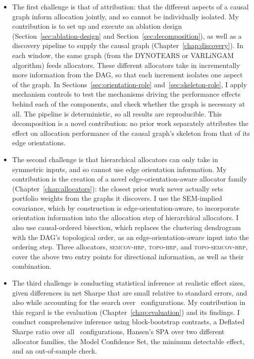 \documentclass[11pt, a4paper]{report}
\newcommand{\semcovhrp}{\textsc{semcov-hrp}}
\newcommand{\topohrp}{\textsc{topo-hrp}}
\newcommand{\toposemcovhrp}{\textsc{topo-semcov-hrp}}
\begin{document}
\begin{itemize}[itemsep=2pt]
  \item The first challenge is that of attribution: that
        the different aspects of a causal graph inform allocation jointly, and so
        cannot be individually isolated. My contribution is to set up and execute an ablation design
        (Section~\ref{sec:ablation-design} and
        Section~\ref{sec:decomposition}), as well as a discovery pipeline to supply the causal graph
        (Chapter~\ref{chap:discovery}). In each window, the same graph (from the DYNOTEARS
        or VARLiNGAM algorithm) feeds allocators. These different allocators take in incrementally
        more information from the DAG, so that each increment isolates one aspect of
        the graph. 
        In Sections~\ref{sec:orientation-role}
        and~\ref{sec:skeleton-role}, I apply mechanism controls to test the mechanisms driving the performance effects behind each of the components, and check whether the graph is necessary
        at all. 
        The pipeline is deterministic, so all results are reproducible. 
        This decomposition is a novel contribution: no prior work separately attributes the effect on allocation performance of the causal graph's skeleton from that of
        its edge orientations.
  \item The second challenge is that hierarchical
        allocators can only take in symmetric inputs, and so cannot use edge orientation information. My contribution is the creation of a novel edge-orientation-aware allocator family (Chapter~\ref{chap:allocators}): the closest prior work
        \cite{howard2025causal} never actually sets portfolio weights from the graphs it discovers. 
        I use the SEM-implied covariance, which by construction is edge-orientation-aware, to incorporate orientation information into the allocation step of hierarchical allocators.
        I also use causal-ordered bisection, which replaces the clustering
        dendrogram with the DAG's topological order, as an edge-orientation-aware input into the ordering step. Three allocators, \semcovhrp{}, \topohrp{}, and \toposemcovhrp{}, cover the above two entry points for directional information, as well as their combination.
  \item The third challenge is conducting statistical inference at realistic effect sizes, given differences in net Sharpe that are small relative to standard errors, and also while accounting for the search over \rsNtrials\ configurations. 
  My contribution in this regard is the evaluation (Chapter~\ref{chap:evaluation}) and its findings. I conduct comprehensive inference using block-bootstrap contrasts, a Deflated Sharpe ratio over all \rsNtrials\ configurations, Hansen's SPA over two different allocator families, the Model Confidence Set, the minimum detectable effect, and an out-of-sample check.

\end{itemize}
\end{document}
